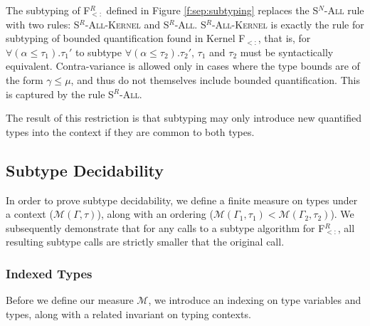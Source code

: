\documentclass[runningheads]{llncs}
\begin{document}
The subtyping of F$_{<:}^R$ defined in Figure \ref{f:sep:subtyping} replaces the \textsc{S$^N$-All} rule with two rules: \textsc{S$^R$-All-Kernel} and \textsc{S$^R$-All}. 
\textsc{S$^R$-All-Kernel} is exactly the rule for subtyping of bounded quantification found in Kernel F$_{<:}$, that is, 
for $\forall(\alpha \leqslant \tau_1).\tau_1'$ to subtype $\forall(\alpha \leqslant \tau_2).\tau_2'$, $\tau_1$ and $\tau_2$ must be syntactically equivalent.
Contra-variance is allowed only in cases where the type bounds are of the form $\gamma \leqslant \mu$, and thus do not themselves include bounded quantification.
This is captured by the rule \textsc{S$^R$-All}.

The result of this restriction is that subtyping may only introduce new quantified types into the context if they are common to both types.

\subsection{Subtype Decidability}

In order to prove subtype decidability, we define a finite measure on types under a context ($\mathcal{M}(\Gamma, \tau)$), along 
with an ordering ($\mathcal{M}(\Gamma_1, \tau_1) < \mathcal{M}(\Gamma_2, \tau_2)$). 
We subsequently demonstrate that for any calls to a subtype algorithm for F$_{<:}^R$, all resulting subtype calls are strictly 
smaller that the original call.

\subsubsection{Indexed Types}
Before we define our measure $\mathcal{M}$, we introduce an indexing on type variables and types, along with a related invariant on typing contexts.
\end{document}
